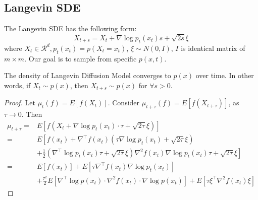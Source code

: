 \subsection{Langevin SDE}
The Langevin SDE has the following form:
\begin{equation}
    X_{t + s} = X_t + \nabla \log p_t(x_t)s + \sqrt{2s}\xi
\end{equation}
where $X_t\in \mathcal{R}^d, p_t(x_t)=p(X_t=x_t)$, $\xi\sim N(0, I)$, $I$ is identical matrix of $m \times m$. Our goal is to sample from specific $p(x, t)$.

\begin{theorem}
    The density of Langevin Diffusion Model converges to $p(x)$ over time. In other words, if $X_t\sim p(x)$, then $X_{t+s}\sim p(x)$ for $\forall s>0$. 
\end{theorem}
\begin{proof}
    Let  $\mu_{t}(f)=E\left[f\left(X_{t}\right)\right]$. Consider  $\mu_{t+\tau}(f)=E\left[f\left(X_{t+\tau}\right)\right]$, as $\tau \rightarrow 0$. Then  
\begin{equation}
    \begin{aligned}
        \mu_{t+\tau}=&E\left[f\left(X_{t}+\nabla \log p_t\left(x_{t}\right) \cdot \tau+\sqrt{2 \tau} \xi\right)\right]\\
        =&E\left[f\left(x_{t}\right)+\nabla^{\top} f\left(x_{t}\right)\left(\tau \nabla \log p_t\left(x_{t}\right)+\sqrt{2 \tau} \xi\right)\right. \\
        &+\frac{1}{2}\left.\left(\nabla^{\top}\log p_t(x_t)\tau + \sqrt{2\tau}\xi\right)\nabla^2f(x_t)\nabla\log p_t(x_t)\tau + \sqrt{2\tau}\xi\right]\\
        =&E\left[f\left(x_{t}\right)\right]+E\left[\tau \nabla^{\top}f\left(x_{t}\right) \nabla \log p_t\left(x_{t}\right)\right]\\
        &+\frac{\tau^{2}}{2} E\left[\nabla^{\top} \log p\left(x_{t}\right) \cdot \nabla^{2} f\left(x_{t}\right) \cdot \nabla \log p\left(x_{t}\right)\right] +E\left[\tau \xi^{\top} \nabla^{2} f\left(x_{t}\right) \xi\right]
    \end{aligned}
\end{equation}
 

\end{proof}
